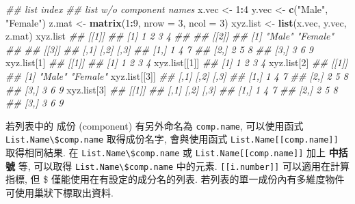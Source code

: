 \documentclass[
]{book}
\newenvironment{Shaded}{\begin{snugshade}}{\end{snugshade}}
\newcommand{\CommentTok}[1]{\textcolor[rgb]{0.56,0.35,0.01}{\textit{#1}}}
\newcommand{\DataTypeTok}[1]{\textcolor[rgb]{0.13,0.29,0.53}{#1}}
\newcommand{\DecValTok}[1]{\textcolor[rgb]{0.00,0.00,0.81}{#1}}
\newcommand{\KeywordTok}[1]{\textcolor[rgb]{0.13,0.29,0.53}{\textbf{#1}}}
\newcommand{\NormalTok}[1]{#1}
\newcommand{\OperatorTok}[1]{\textcolor[rgb]{0.81,0.36,0.00}{\textbf{#1}}}
\newcommand{\StringTok}[1]{\textcolor[rgb]{0.31,0.60,0.02}{#1}}
\begin{document}
\begin{Shaded}
\begin{Highlighting}[]
\CommentTok{\#\# list index}
\CommentTok{\#\# list w/o component names}
\NormalTok{x.vec \textless{}{-}}\StringTok{ }\DecValTok{1}\OperatorTok{:}\DecValTok{4}
\NormalTok{y.vec \textless{}{-}}\StringTok{ }\KeywordTok{c}\NormalTok{(}\StringTok{"Male"}\NormalTok{, }\StringTok{"Female"}\NormalTok{)}
\NormalTok{z.mat \textless{}{-}}\StringTok{ }\KeywordTok{matrix}\NormalTok{(}\DecValTok{1}\OperatorTok{:}\DecValTok{9}\NormalTok{, }\DataTypeTok{nrow =} \DecValTok{3}\NormalTok{, }\DataTypeTok{ncol =} \DecValTok{3}\NormalTok{)}
\NormalTok{xyz.list \textless{}{-}}\StringTok{ }\KeywordTok{list}\NormalTok{(x.vec, y.vec, z.mat)}
\NormalTok{xyz.list}
\CommentTok{\#\# [[1]]}
\CommentTok{\#\# [1] 1 2 3 4}
\CommentTok{\#\# }
\CommentTok{\#\# [[2]]}
\CommentTok{\#\# [1] "Male"   "Female"}
\CommentTok{\#\# }
\CommentTok{\#\# [[3]]}
\CommentTok{\#\#      [,1] [,2] [,3]}
\CommentTok{\#\# [1,]    1    4    7}
\CommentTok{\#\# [2,]    2    5    8}
\CommentTok{\#\# [3,]    3    6    9}
\NormalTok{xyz.list[}\DecValTok{1}\NormalTok{]}
\CommentTok{\#\# [[1]]}
\CommentTok{\#\# [1] 1 2 3 4}
\NormalTok{xyz.list[[}\DecValTok{1}\NormalTok{]]}
\CommentTok{\#\# [1] 1 2 3 4}
\NormalTok{xyz.list[}\DecValTok{2}\NormalTok{]}
\CommentTok{\#\# [[1]]}
\CommentTok{\#\# [1] "Male"   "Female"}
\NormalTok{xyz.list[[}\DecValTok{3}\NormalTok{]]}
\CommentTok{\#\#      [,1] [,2] [,3]}
\CommentTok{\#\# [1,]    1    4    7}
\CommentTok{\#\# [2,]    2    5    8}
\CommentTok{\#\# [3,]    3    6    9}
\NormalTok{xyz.list[}\DecValTok{3}\NormalTok{]}
\CommentTok{\#\# [[1]]}
\CommentTok{\#\#      [,1] [,2] [,3]}
\CommentTok{\#\# [1,]    1    4    7}
\CommentTok{\#\# [2,]    2    5    8}
\CommentTok{\#\# [3,]    3    6    9}
\end{Highlighting}
\end{Shaded}

若列表中的 成份 (component)
有另外命名為 \texttt{comp.name},
可以使用函式
\texttt{List.Name\textbackslash{}\$comp.name} 取得成份名字,
會與使用函式
\texttt{List.Name{[}{[}comp.name{]}{]}} 取得相同結果.
在
\texttt{List.Name\textbackslash{}\$comp.name}
或
\texttt{List.Name{[}{[}comp.name{]}{]}}
加上 \textbf{中括號} 等,
可以取得
\texttt{List.Name\textbackslash{}\$comp.name} 中的元素.
\texttt{{[}{[}i.number{]}{]}} 可以適用在計算指標,
但 \$ 僅能使用在有設定的成分名的列表.
若列表的單一成份內有多維度物件
可使用巢狀下標取出資料.
\end{document}

